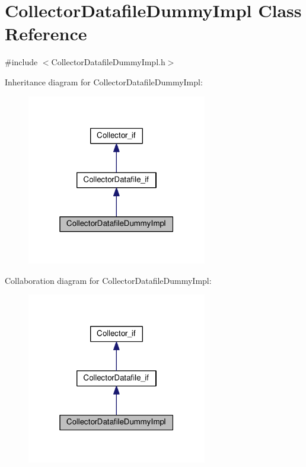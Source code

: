 \hypertarget{class_collector_datafile_dummy_impl}{}\section{Collector\+Datafile\+Dummy\+Impl Class Reference}
\label{class_collector_datafile_dummy_impl}


{\ttfamily \#include $<$Collector\+Datafile\+Dummy\+Impl.\+h$>$}



Inheritance diagram for Collector\+Datafile\+Dummy\+Impl\+:
\nopagebreak
\begin{figure}[H]
\begin{center}
\leavevmode
\includegraphics[width=223pt]{class_collector_datafile_dummy_impl__inherit__graph}
\end{center}
\end{figure}


Collaboration diagram for Collector\+Datafile\+Dummy\+Impl\+:
\nopagebreak
\begin{figure}[H]
\begin{center}
\leavevmode
\includegraphics[width=223pt]{class_collector_datafile_dummy_impl__coll__graph}
\end{center}
\end{figure}
